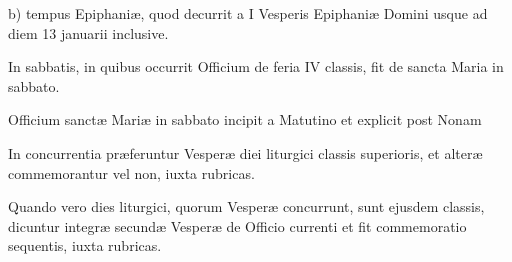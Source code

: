 \documentclass[vesperale_romanum.tex]{subfiles}
\begin{document}
b) tempus Epiphaniæ, quod decurrit a I Vesperis Epiphaniæ Domini usque ad diem 13 januarii inclusive.


In sabbatis, in quibus occurrit Officium de feria IV classis, fit de sancta Maria in sabbato.

Officium sanctæ Mariæ in sabbato incipit a Matutino et explicit post Nonam

 
In concurrentia præferuntur Vesperæ diei liturgici classis superioris, et alteræ commemorantur vel non, iuxta rubricas.

Quando vero dies liturgici, quorum Vesperæ concurrunt, sunt ejusdem classis, dicuntur integræ secundæ Vesperæ de Officio currenti et fit commemoratio sequentis, iuxta rubricas.

\end{document}
